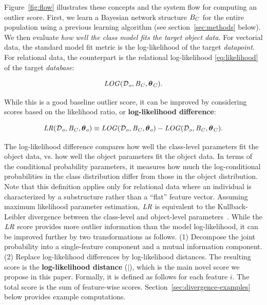 	Figure~\ref{fig:flow} illustrates these concepts and the system flow for computing an outlier score. First, we learn a Bayesian network structure $B_{C}$ for the entire population using a previous learning algorithm (see section~\ref{sec:methods} below). We then evaluate {\em how well the class model fits the target object data.} For vectorial data, the  standard model fit metric %
	is the log-likelihood of the target {\em datapoint}. For relational data, the counterpart is the relational log-likelihood \eqref{eq:likelihood} of the target {\em database}:
	
	\begin{equation} \label{eq:loglikelihood-score}
	\it{LOG}(\mathcal{D}_{o},B_{C},\boldsymbol{\theta}_{C}).
	\end{equation}
	
	
	
	While this
	is a good baseline outlier score, it can be improved by considering scores based on the likelihood ratio, or {\bf log-likelihood difference}:
	
	\begin{equation} \label{eq:log-diff}
	\it{LR}(\mathcal{D}_{o},B_{C},\boldsymbol{\theta}_{o}) \equiv \it{LOG}(\mathcal{D}_{o},B_{C},\boldsymbol{\theta}_{o}) - \it{LOG}(\mathcal{D}_{o},B_{C},\boldsymbol{\theta}_{C}).
	\end{equation}
	
	The log-likelihood difference compares  how well the class-level parameters fit the object data, vs. how well the object parameters fit the object data. In terms of the conditional probability parameters, it measures how much the log-conditional probabilities in the class distribution differ from those in the object distribution. Note that this definition applies only for relational data where an individual is characterized by a substructure rather than a ``flat'' feature vector. Assuming maximum likelihood parameter estimation, $\it{LR}$ is equivalent to the Kullback-Leibler divergence between the class-level and object-level parameters~\cite{Campos2006}. 
	While the $\it{LR}$ score provides more outlier information than the model log-likelihood, it can be improved further by two transformations as follows. (1) Decompose the joint probability into a single-feature component and a mutual information component. (2) Replace log-likelihood differences by log-likelihood distances. The resulting score is the \textbf{log-likelihood distance} ($\mid$), which is the main novel score we propose in this paper. Formally, it is defined as follows for each feature $i$. The total score is the sum of feature-wise scores. Section~\ref{sec:divergence-examples} 
	below provides example computations.
	
